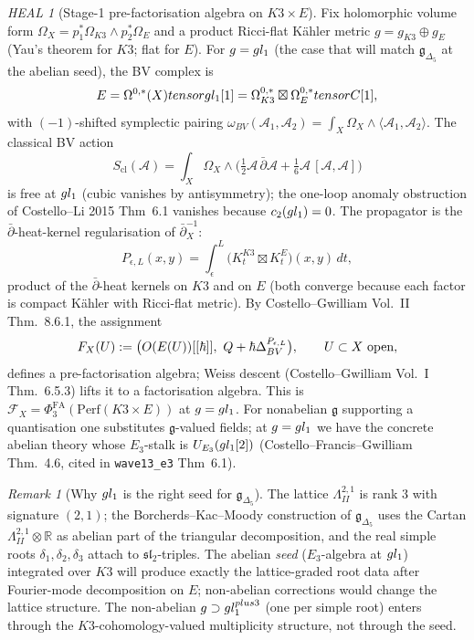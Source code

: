 \documentclass[11pt]{amsart}
\providecommand{\C}{\mathbb{C}}
\providecommand{\R}{\mathbb{R}}
\providecommand{\cO}{\mathcal{O}}
\providecommand{\cF}{\mathcal{F}}
\providecommand{\cA}{\mathcal{A}}
\providecommand{\Perf}{\mathrm{Perf}}
\providecommand{\frakg}{\mathfrak{g}}
\providecommand{\gDelta}{\mathfrak{g}_{\Delta_5}}
\providecommand{\Lat}{\Lambda}
\providecommand{\dbar}{\bar{\partial}}
\theoremstyle{plain}
\theoremstyle{definition}
\theoremstyle{remark}
\newtheorem{remark}[theorem]{Remark}
\newtheorem*{heal}{HEAL}
\begin{document}
\begin{heal}[Stage-1 pre-factorisation algebra on $K3\times E$]
\label{heal:stage1}
Fix holomorphic volume form $\Omega_X = p_1^\ast\Omega_{K3}\wedge
p_2^\ast\Omega_E$ and a product Ricci-flat K\"ahler metric $g=g_{K3}\oplus
g_E$ (Yau's theorem for $K3$; flat for $E$). For $\frakg=\fgl_1$ (the
case that will match $\gDelta$ at the abelian seed), the BV complex is
\[
\cE = \Omega^{0,\ast}(X)\otimes\fgl_1[1]
= \Omega^{0,\ast}_{K3}\boxtimes\Omega^{0,\ast}_E\otimes\C[1],
\]
with $(-1)$-shifted symplectic pairing $\omega_{BV}(\cA_1,\cA_2)=\int_X
\Omega_X\wedge\langle\cA_1,\cA_2\rangle$. The classical BV action
\[
S_{\mathrm{cl}}(\cA)=\int_X \Omega_X\wedge\bigl(\tfrac12 \cA\,\dbar\cA +
\tfrac16 \cA\,[\cA,\cA]\bigr)
\]
is free at $gl_1$ (cubic vanishes by antisymmetry); the one-loop
anomaly obstruction of Costello--Li 2015 Thm~6.1 vanishes because
$c_2(gl_1)=0$. The propagator is the $\dbar$-heat-kernel regularisation
of $\dbar_X^{-1}$:
\[
P_{\epsilon,L}(x,y) = \int_\epsilon^L \bigl(K^{K3}_t\boxtimes K^E_t\bigr)(x,y)\,dt,
\]
product of the $\dbar$-heat kernels on $K3$ and on $E$ (both converge
because each factor is compact K\"ahler with Ricci-flat metric). By
Costello--Gwilliam Vol.~II Thm.~8.6.1, the assignment
\[
\cF_X(U) := \bigl(\cO(\cE(U))[[\hbar]],\ Q+\hbar\Delta^{P_{\epsilon,L}}_{BV}\bigr),
\qquad U\subset X\ \text{open},
\]
defines a pre-factorisation algebra; Weiss descent (Costello--Gwilliam
Vol.~I Thm.~6.5.3) lifts it to a factorisation algebra. This is
$\cF_X = \Phi^{\mathrm{FA}}_3(\Perf(K3\times E))$ at $\frakg=\fgl_1$. For
nonabelian $\frakg$ supporting a quantisation one substitutes
$\frakg$-valued fields; at $\frakg=\fgl_1$ we have the concrete abelian
theory whose $E_3$-stalk is $U_{E_3}(gl_1[2])$ (Costello--Francis--Gwilliam
Thm.~4.6, cited in \texttt{wave13\_e3} Thm~6.1).
\end{heal}

\begin{remark}[Why $gl_1$ is the right seed for $\gDelta$]
\label{rem:gl1-seed}
The lattice $\Lat^{2,1}_{II}$ is rank $3$ with signature $(2,1)$; the
Borcherds--Kac--Moody construction of $\gDelta$ uses the Cartan
$\Lat^{2,1}_{II}\otimes\R$ as abelian part of the triangular decomposition,
and the real simple roots $\delta_1,\delta_2,\delta_3$ attach to
$\mathfrak{sl}_2$-triples. The abelian \emph{seed} ($E_3$-algebra at
$gl_1$) integrated over $K3$ will produce exactly the lattice-graded
root data after Fourier-mode decomposition on $E$; non-abelian
corrections would change the lattice structure. The non-abelian
$\frakg\supset\fgl_1^{\oplus 3}$ (one per simple root) enters through
the $K3$-cohomology-valued multiplicity structure, not through the
seed.
\end{remark}
\end{document}
